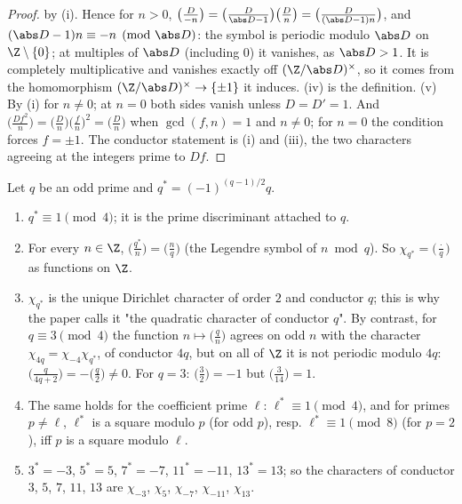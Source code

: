 \begin{proof}
by (i). Hence for $n>0$, $\bigl(\frac D{-n}\bigr)=\bigl(\frac D{\abs D-1}\bigr)\bigl(\frac Dn\bigr)=\bigl(\frac D{(\abs D-1)n}\bigr)$, and $(\abs D-1)n\equiv-n\pmod{\abs D}$: the symbol is periodic modulo $\abs D$
on $\Z\setminus\{0\}$; at multiples of $\abs D$ (including $0$) it vanishes, as $\abs D>1$. It is completely multiplicative and vanishes exactly off
$(\Z/\abs D)^\times$, so it comes from the homomorphism $(\Z/\abs D)^\times\to\{\pm1\}$ it induces.
(iv) is the definition. (v) By (i) for $n\ne0$; at $n=0$ both sides vanish unless $D=D'=1$. And $\bigl(\frac{Df^2}n\bigr)=\bigl(\frac Dn\bigr)\bigl(\frac fn\bigr)^2=\bigl(\frac Dn\bigr)$ when
$\gcd(f,n)=1$ and $n\ne0$; for $n=0$ the condition forces $f=\pm1$. The conductor statement is (i) and (iii), the two characters
agreeing at the integers prime to $Df$.
\end{proof}

\begin{proposition}\label{prop:rings:qstar}
Let $q$ be an odd prime and $q^*=(-1)^{(q-1)/2}q$.
\begin{enumerate}[label=(\roman*)]
\item $q^*\equiv1\pmod4$; it is the prime discriminant attached to $q$.
\item For every $n\in\Z$, $\bigl(\frac{q^*}n\bigr)=\bigl(\frac nq\bigr)$ (the Legendre symbol of $n\bmod q$). So $\chi_{q^*}=\bigl(\frac\cdot q\bigr)$ as functions on $\Z$.
\item $\chi_{q^*}$ is the unique Dirichlet character of order $2$ and conductor $q$; this is why the paper calls it "the quadratic character of
conductor $q$". By contrast, for $q\equiv3\pmod4$ the function $n\mapsto\bigl(\frac qn\bigr)$ agrees on odd $n$ with the character $\chi_{4q}=\chi_{-4}\chi_{q^*}$, of
conductor $4q$, but on all of $\Z$ it is not periodic modulo $4q$: $\bigl(\frac q{4q+2}\bigr)=-\bigl(\frac q2\bigr)\ne0$. For $q=3$:
$\bigl(\frac32\bigr)=-1$ but $\bigl(\frac3{14}\bigr)=1$.
\item The same holds for the coefficient prime $\ell$: $\ell^*\equiv1\pmod4$, and for primes $p\ne\ell$, $\ell^*$ is a square modulo $p$ (for odd $p$), resp.
$\ell^*\equiv1\pmod8$ (for $p=2$), iff $p$ is a square modulo $\ell$.
\item $3^*=-3$, $5^*=5$, $7^*=-7$, $11^*=-11$, $13^*=13$; so the characters of conductor $3$, $5$, $7$, $11$, $13$ are $\chi_{-3}$, $\chi_5$, $\chi_{-7}$, $\chi_{-11}$,
$\chi_{13}$.
\end{enumerate}
\end{proposition}

